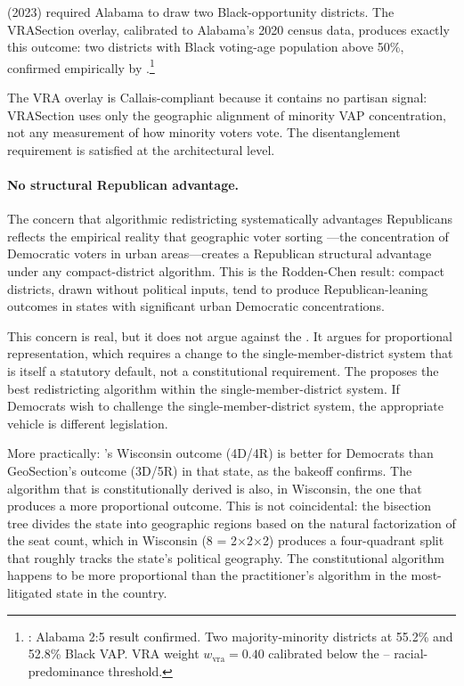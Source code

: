 \allenmilligan{} (2023) required Alabama to draw two Black-opportunity
districts.
The VRASection overlay, calibrated to Alabama's 2020 census data, produces
exactly this outcome: two districts with Black voting-age population
above 50\%, confirmed empirically by \citet{b14paper}.\footnote{%
  \citet{b14paper}: Alabama 2:5 result confirmed.
  Two majority-minority districts at 55.2\% and 52.8\% Black VAP.
  VRA weight $w_\text{vra} = 0.40$ calibrated below the \shaw{}--\miller{}
  racial-predominance threshold.
}

The VRA overlay is Callais-compliant because it contains no partisan
signal: VRASection uses only the geographic alignment of minority VAP
concentration, not any measurement of how minority voters vote.
The \callais{} disentanglement requirement is satisfied at the architectural
level.

\paragraph{No structural Republican advantage.}
The concern that algorithmic redistricting systematically advantages
Republicans reflects the empirical reality that geographic voter sorting
\citep{rodden2019,chen2013}---the concentration of Democratic voters in
urban areas---creates a Republican structural advantage under any compact-district
algorithm.
This is the Rodden-Chen result: compact districts, drawn without political
inputs, tend to produce Republican-leaning outcomes in states with
significant urban Democratic concentrations.

This concern is real, but it does not argue against the \dia{}.
It argues for proportional representation, which requires a change to the
single-member-district system that is itself a statutory default, not a
constitutional requirement.
The \dia{} proposes the best redistricting algorithm within the
single-member-district system.
If Democrats wish to challenge the single-member-district system, the
appropriate vehicle is different legislation.

More practically: \ar{}'s Wisconsin outcome (4D/4R) is better for Democrats
than GeoSection's outcome (3D/5R) in that state, as the bakeoff confirms.
The algorithm that is constitutionally derived is also, in Wisconsin, the
one that produces a more proportional outcome.
This is not coincidental: the \hh{} bisection tree divides the state into
geographic regions based on the natural factorization of the seat count,
which in Wisconsin (8 = 2$\times$2$\times$2) produces a four-quadrant split
that roughly tracks the state's political geography.
The constitutional algorithm happens to be more proportional than the
practitioner's algorithm in the most-litigated state in the country.

